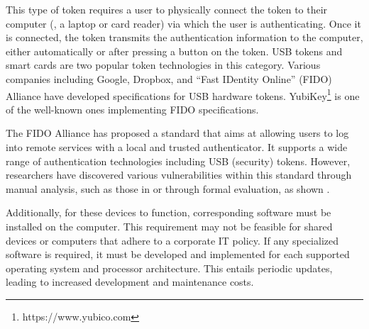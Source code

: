 



This type of token requires a user to physically connect the token to their computer (\eg, a laptop or card reader) via which the user is authenticating. Once it is connected, the token transmits the authentication information to the computer, either automatically or after pressing a button on the token. USB tokens and smart cards are two popular token technologies in this category.  Various companies including Google, Dropbox, and  ``Fast IDentity Online'' (FIDO) Alliance have developed specifications for USB hardware tokens. YubiKey\footnote{https://www.yubico.com} is one of the well-known ones implementing FIDO specifications. 

The FIDO  Alliance has proposed a standard that aims at allowing users to log into remote services with a local and trusted authenticator. It supports a wide range of authentication technologies including USB (security) tokens. However, researchers have discovered various vulnerabilities within this standard through manual analysis, such as those in \cite{PanosMNPX17,ChangMSS17,LoutfiJ15} or through formal evaluation, as shown \cite{ndss/FengLP021}. 

Additionally, for these devices to function, corresponding software must be installed on the computer. This requirement may not be feasible for shared devices or computers that adhere to a corporate IT policy. If any specialized software is required, it must be developed and implemented for each supported operating system and processor architecture. This entails periodic updates, leading to increased development and maintenance costs.


